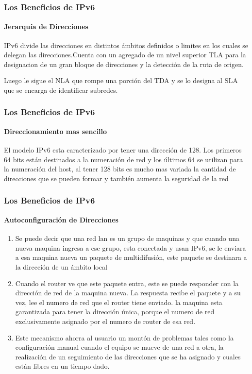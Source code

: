 \documentclass{beamer}
\begin{document}
\begin{frame}
\frametitle{Los Beneficios de IPv6}
\framesubtitle{Jerarquía de Direcciones}


IPv6 divide las direcciones en distintos ámbitos definidos o limites en los cuales se delegan las 
direcciones.Cuenta con un agregado de un nivel superior TLA para la designacion de un gran bloque de direcciones y la detección de la ruta de origen.\par Luego le sigue el NLA que rompe una porción del TDA  y se lo designa al SLA que se encarga de identificar subredes.

\end{frame}

\begin{frame}
\frametitle{Los Beneficios de IPv6}
\framesubtitle{Direccionamiento mas sencillo}
El modelo IPv6 esta  caracterizado por tener una dirección de 128. Los primeros 64 bits están 
destinados a la numeración de red y los últimos 64 se utilizan para la numeración del host,
al tener 
128 bits es mucho mas variada la cantidad de direcciones que se pueden formar y también aumenta la 
seguridad de la red

\end{frame}

\begin{frame}
\frametitle{Los Beneficios de IPv6}
\framesubtitle{Autoconfiguración de Direcciones}

\begin{enumerate}[$*$]
	
 \item Se puede decir que una red lan es un grupo de 
maquinas y que cuando una nueva maquina ingresa a ese grupo, esta conectada y usan IPv6, se le 
enviara a esa maquina nueva un paquete de multidifusión, este paquete se destinara a la dirección 
de un ámbito local
\item Cuando el router ve que este paquete entra, este se puede responder con la 
dirección de red de la maquina nueva. La respuesta recibe el paquete y a su vez, lee el numero de 
red que el router tiene enviado. la maquina esta garantizada para tener la dirección única, 
porque el numero de red exclusivamente asignado por el numero de router de esa red.
\item Este mecanismo ahorra al usuario un montón de problemas tales como la configuración manual cuando el 
equipo se mueve de una red a otra, la realización de un seguimiento de las direcciones que se ha 
asignado y cuales están libres en un tiempo dado.


\end{enumerate}

\end{frame}
\end{document}
